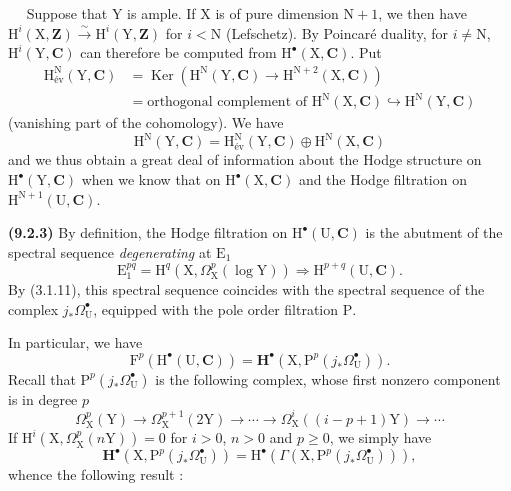 \documentclass[11pt,leqno]{article}
\newcommand{\Page}[1]{\ifvmode\noindent\else\unskip\ \fi{\footnotesize\textcolor{gray}{[p.\,#1]}}\ \ignorespaces}
\begin{document}
\Page{49}
Suppose that \(\mathrm{Y}\) is ample. If \(\mathrm{X}\) is of pure dimension \(\mathrm{N}+1\), we then have \(\mathrm{H}^{i}(\mathrm{X},\mathbf{Z})\xrightarrow{\sim}\mathrm{H}^{i}(\mathrm{Y},\mathbf{Z})\) for \(i<\mathrm{N}\) (Lefschetz). By Poincaré duality, for \(i\neq\mathrm{N}\), \(\mathrm{H}^{i}(\mathrm{Y},\mathbf{C})\) can therefore be computed from \(\mathrm{H}^{\bullet}(\mathrm{X},\mathbf{C})\). Put
\[
\begin{aligned}
\mathrm{H}_{\text{év}}^{\mathrm{N}}(\mathrm{Y},\mathbf{C})
&=\operatorname{Ker}(\mathrm{H}^{\mathrm{N}}(\mathrm{Y},\mathbf{C})\to\mathrm{H}^{\mathrm{N}+2}(\mathrm{X},\mathbf{C}))\\
&=\text{orthogonal complement of }\mathrm{H}^{\mathrm{N}}(\mathrm{X},\mathbf{C})
\hookrightarrow\mathrm{H}^{\mathrm{N}}(\mathrm{Y},\mathbf{C})
\end{aligned}
\]
(vanishing part of the cohomology). We have
\[
\mathrm{H}^{\mathrm{N}}(\mathrm{Y},\mathbf{C})
=\mathrm{H}_{\text{év}}^{\mathrm{N}}(\mathrm{Y},\mathbf{C})
\oplus\mathrm{H}^{\mathrm{N}}(\mathrm{X},\mathbf{C})
\]
and we thus obtain a great deal of information about the Hodge structure on \(\mathrm{H}^{\bullet}(\mathrm{Y},\mathbf{C})\) when we know that on \(\mathrm{H}^{\bullet}(\mathrm{X},\mathbf{C})\) and the Hodge filtration on \(\mathrm{H}^{\mathrm{N}+1}(\mathrm{U},\mathbf{C})\).

\textbf{(9.2.3)} By definition, the Hodge filtration on \(\mathrm{H}^{\bullet}(\mathrm{U},\mathbf{C})\) is the abutment of the spectral sequence \textit{degenerating} at \(\mathrm{E}_{1}\)
\[
\mathrm{E}_{1}^{pq}
=\mathrm{H}^{q}(\mathrm{X},\Omega_{\mathrm{X}}^{p}(\log\mathrm{Y}))
\Rightarrow\mathrm{H}^{p+q}(\mathrm{U},\mathbf{C}).
\]
By (3.1.11), this spectral sequence coincides with the spectral sequence of the complex \(j_{*}\Omega_{\mathrm{U}}^{\bullet}\), equipped with the pole order filtration \(\mathrm{P}\).

In particular, we have
\[
\mathrm{F}^{p}(\mathrm{H}^{\bullet}(\mathrm{U},\mathbf{C}))
=\mathbf{H}^{\bullet}(\mathrm{X},\mathrm{P}^{p}(j_{*}\Omega_{\mathrm{U}}^{\bullet})).
\]
Recall that \(\mathrm{P}^{p}(j_{*}\Omega_{\mathrm{U}}^{\bullet})\) is the following complex, whose first nonzero component is in degree \(p\)
\[
\Omega_{\mathrm{X}}^{p}(\mathrm{Y})
\to\Omega_{\mathrm{X}}^{p+1}(2\mathrm{Y})
\to\cdots\to
\Omega_{\mathrm{X}}^{i}((i-p+1)\mathrm{Y})
\to\cdots
\]
If \(\mathrm{H}^{i}(\mathrm{X},\Omega_{\mathrm{X}}^{p}(n\mathrm{Y}))=0\) for \(i>0\), \(n>0\) and \(p\geq0\), we simply have
\[
\mathbf{H}^{\bullet}(\mathrm{X},\mathrm{P}^{p}(j_{*}\Omega_{\mathrm{U}}^{\bullet}))
=\mathrm{H}^{\bullet}(\Gamma(\mathrm{X},\mathrm{P}^{p}(j_{*}\Omega_{\mathrm{U}}^{\bullet}))),
\]
whence the following result :
\end{document}
